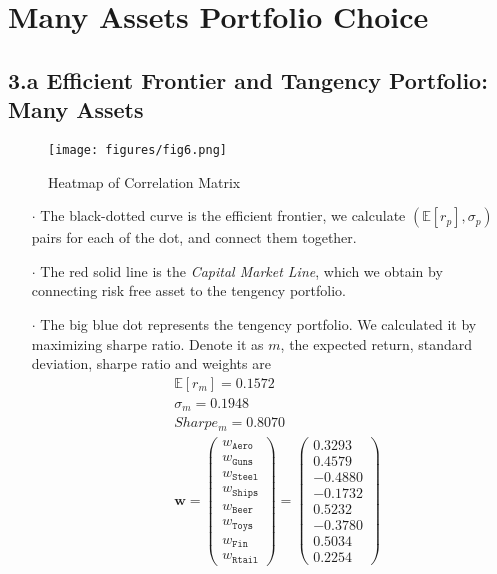 \documentclass[10 pt]{hwtemplate} %
\begin{document}
\section{Many Assets Portfolio Choice}
\subsection*{3.a Efficient Frontier and Tangency Portfolio: Many Assets}
\begin{figure}[H]
  \centering
  \captionsetup{justification=centering}
  \caption{\label{fig:exretcorr}Heatmap of Correlation Matrix}
  \vspace{-10pt}
  \texttt{[image: figures/fig6.png]}
\end{figure}

\begin{itemize}
  \item[$\cdot$] The black-dotted curve is the efficient frontier, we calculate $(\mathbb{E}\left[r_p\right], \sigma_p)$ pairs for each of the dot, and connect them together.
  \item[$\cdot$] The red solid line is the \textit{Capital Market Line}, which we obtain by connecting risk free asset to the tengency portfolio.
  \item[$\cdot$] The big blue dot represents the tengency portfolio. We calculated it by maximizing sharpe ratio. Denote it as $m$, the expected return, standard deviation, sharpe ratio and weights are
  \begin{equation}
    \begin{split}
      &\mathbb{E}\left[r_m\right] = 0.1572\\
      &\sigma_m = 0.1948\\
      &Sharpe_m = 0.8070 \\
      &\bm{w} = \begin{pmatrix}
        w_{\mathtt{Aero}}\\
        w_{\mathtt{Guns}}\\
        w_{\mathtt{Steel}}\\
        w_{\mathtt{Ships}}\\
        w_{\mathtt{Beer}}\\
        w_{\mathtt{Toys}}\\
        w_{\mathtt{Fin}}\\
        w_{\mathtt{Rtail}}
      \end{pmatrix}=
      \begin{pmatrix}
        0.3293\\
        0.4579\\
        -0.4880\\
        -0.1732\\
        0.5232\\
        -0.3780\\
        0.5034\\
        0.2254
      \end{pmatrix}
    \end{split}
  \end{equation}
\end{itemize}
\end{document}
